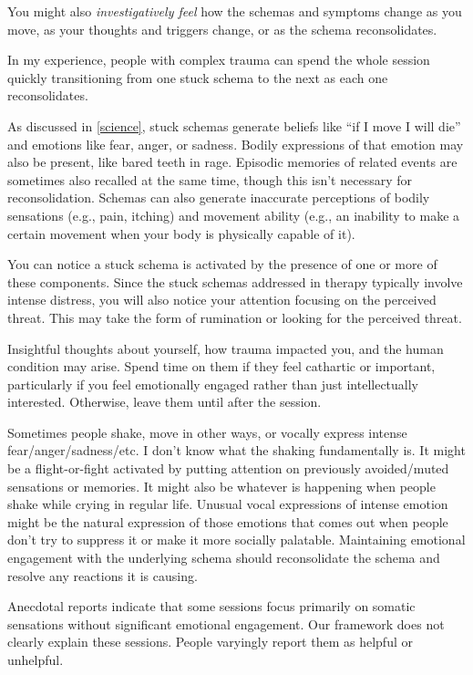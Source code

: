\documentclass[11pt,oneside]{book}
\begin{document}
You might also \textit{investigatively feel} how the schemas and symptoms change as you move, as your thoughts and triggers change, or as the schema reconsolidates.

In my experience, people with complex trauma can spend the whole session quickly transitioning from one stuck schema to the next as each one reconsolidates.

As discussed in \cref{science}, stuck schemas generate beliefs like \enquote{if I move I will die} and emotions like fear, anger, or sadness. Bodily expressions of that emotion may also be present, like bared teeth in rage. Episodic memories of related events are sometimes also recalled at the same time, though this isn't necessary for reconsolidation. Schemas can also generate inaccurate perceptions of bodily sensations (e.g., pain, itching) and movement ability (e.g., an inability to make a certain movement when your body is physically capable of it).

You can notice a stuck schema is activated by the presence of one or more of these components. Since the stuck schemas addressed in therapy typically involve intense distress, you will also notice your attention focusing on the perceived threat. This may take the form of rumination or looking for the perceived threat.

Insightful thoughts about yourself, how trauma impacted you, and the human condition may arise. Spend time on them if they feel cathartic or important, particularly if you feel emotionally engaged rather than just intellectually interested. Otherwise, leave them until after the session.

Sometimes people shake, move in other ways, or vocally express intense fear/anger/sadness/etc. I don't know what the shaking fundamentally is. It might be a flight-or-fight activated by putting attention on previously avoided/muted sensations or memories. It might also be whatever is happening when people shake while crying in regular life. Unusual vocal expressions of intense emotion might be the natural expression of those emotions that comes out when people don't try to suppress it or make it more socially palatable. Maintaining emotional engagement with the underlying schema should reconsolidate the schema and resolve any reactions it is causing.

Anecdotal reports indicate that some sessions focus primarily on somatic sensations without significant emotional engagement. Our framework does not clearly explain these sessions. People varyingly report them as helpful or unhelpful.
\end{document}

